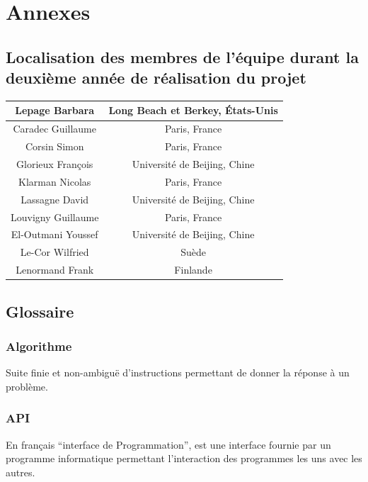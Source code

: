 \documentclass{life-fr}
\begin{document}
\newpage
\hspace{2cm}
\newpage

\chapter{Annexes}

\section{Localisation des membres de l'équipe durant la deuxième année de réalisation du projet}

\begin{tabular}{|c|c|}
  \hline
  Lepage Barbara & Long Beach et Berkey, États-Unis\\
  \hline
  Caradec Guillaume & Paris, France\\
  \hline
  Corsin Simon & Paris, France\\
  \hline
  Glorieux François & Université de Beijing, Chine\\
  \hline
  Klarman Nicolas & Paris, France\\
  \hline
  Lassagne David & Université de Beijing, Chine\\
  \hline
  Louvigny Guillaume & Paris, France\\
  \hline
  El-Outmani Youssef & Université de Beijing, Chine\\
  \hline
  Le-Cor Wilfried & Suède\\
  \hline
  Lenormand Frank & Finlande\\
  \hline
\end{tabular}

\newpage

\section{Glossaire}

\subsection{ Algorithme}
Suite finie et non-ambiguë d’instructions permettant de donner la réponse à un problème.

\subsection{ API}
En français ``interface de Programmation'', est une interface fournie par un programme informatique permettant l'interaction des programmes les uns avec les autres.
\end{document}
